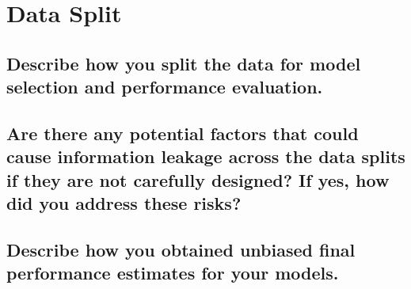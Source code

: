 
\section{Data Split} 
\label{sec:Data Split}






\subsection{Describe how you split the data for model selection and performance evaluation. }
\label{sec:Data Split:a}






\subsection{Are there any potential factors that could cause information leakage across the data splits if they are not carefully designed? If yes, how did you address these risks?}
\label{sec:Data Split:b}



\subsection{Describe how you obtained unbiased final performance estimates for your models. }
\label{sec:Data Split:c}



